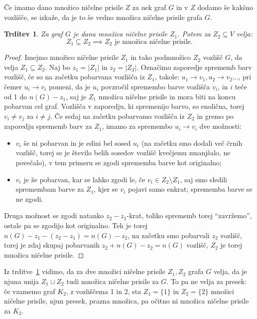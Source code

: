 \documentclass[12pt,a4paper,twoside]{article}
\theoremstyle{definition} %
\theoremstyle{plain} %
\newtheorem{trditev}[definicija]{Trditev}
\numberwithin{equation}{section}  %
\begin{document}
Če imamo dano množico ničelne prisile $Z$ za nek graf $G$ in v $Z$ dodamo še kakšno vozlišče, se izkaže, da je to še vedno množica ničelne prisile grafa $G$.
\begin{trditev}
    \label{trd:nadmnozica-zfs-je-zfs}
    Za graf $G$ je dana množica ničelne prisile $Z_1$. Potem za $Z_2 \subseteq V$ velja:
    \[ Z_1 \subseteq Z_2 \implies Z_2 \text{ je množica ničelne prisile}. \]
\end{trditev}
\begin{proof}
    Imejmo množico ničelne prisile $Z_1$ in tako podmnožico $Z_2$ vozlišč $G$, da velja $Z_1 \subseteq Z_2$. Naj bo $z_1 = |Z_1|$ in $z_2 = |Z_2|$. Označimo zaporedje sprememb barv vozlišč, če so na začetku pobarvana vozlišča iz $Z_1$, takole: $u_1 \rightarrow v_1, u_2 \rightarrow v_2 \ldots$, pri čemer $u_i \rightarrow v_i$ pomeni, da je $u_i$ povzročil spremembo barve vozlišča $v_i$, in $i$ teče od 1 do $n(G) - z_1$, saj je $Z_1$ množica ničelne prisile in mora biti na koncu pobarvan cel graf. Vozlišča v zaporedju, ki spremenijo barvo, so enolična, torej $v_i \neq v_j$ za $i \neq j$. Če sedaj na začetku pobarvamo vozlišča iz $Z_2$ in gremo po zaporedju sprememb barv za $Z_1$, imamo za spremembo $u_i \rightarrow v_i$ dve možnosti:
    \begin{itemize}
        \item $v_i$ še ni pobarvan in je edini bel sosed $u_i$ (na začetku smo dodali več črnih vozlišč, torej se je število belih sosedov vozlišč kvečjemu zmanjšalo, ne povečalo), v tem primeru se zgodi sprememba barve kot originalno;
        \item $v_i$ je že pobarvan, kar se lahko zgodi le, če $v_i \in Z_2 \setminus Z_1$, saj smo sledili spremembam barve za $Z_1$, kjer se $v_i$ pojavi samo enkrat; sprememba barve se ne zgodi.
    \end{itemize}
Druga možnost se zgodi natanko $z_2 - z_1$-krat, toliko sprememb torej ``zavržemo'', ostale pa se zgodijo kot originalno. Teh je torej $n(G) - z_1 -(z_2 - z_1) = n(G) - z_2$, na začetku smo pobarvali $z_2$ vozlišč, torej je zdaj skupaj pobarvanih $z_2 + n(G) - z_2 = n(G)$ vozlišč, $Z_2$ je torej množica ničelne prisile.
\end{proof}

Iz trditve~\ref{trd:nadmnozica-zfs-je-zfs} vidimo, da za dve množici ničelne prisile $Z_1, Z_2$ grafa $G$ velja, da je njuna unija $Z_1 \cup Z_2$ tudi množica ničelne prisile za $G$. To pa ne velja za presek: če vzamemo graf $K_2$, z vozliščema 1 in 2, sta $Z_1 = \{1\}$ in $Z_2 = \{2\}$ množici ničelne prisile, njun presek, prazna množica, pa očitno ni množica ničelne prisile za $K_2$.
\end{document}
